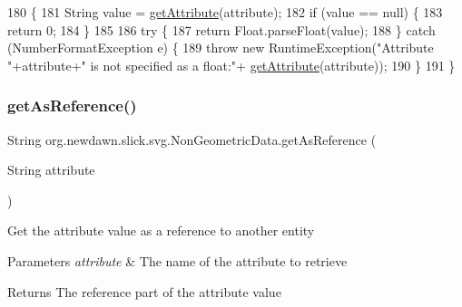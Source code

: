 \begin{DoxyCode}
180                                               \{
181         String value = \mbox{\hyperlink{classorg_1_1newdawn_1_1slick_1_1svg_1_1_non_geometric_data_af14f4628737e3da9379ac25e0a56a92d}{getAttribute}}(attribute);
182         \textcolor{keywordflow}{if} (value == null) \{
183             \textcolor{keywordflow}{return} 0;
184         \}
185         
186         \textcolor{keywordflow}{try} \{
187             \textcolor{keywordflow}{return} Float.parseFloat(value);
188         \} \textcolor{keywordflow}{catch} (NumberFormatException e) \{
189             \textcolor{keywordflow}{throw} \textcolor{keyword}{new} RuntimeException(\textcolor{stringliteral}{"Attribute "}+attribute+\textcolor{stringliteral}{" is not specified as a float:"}+
      \mbox{\hyperlink{classorg_1_1newdawn_1_1slick_1_1svg_1_1_non_geometric_data_af14f4628737e3da9379ac25e0a56a92d}{getAttribute}}(attribute));           
190         \}
191     \}
\end{DoxyCode}
\mbox{\label{classorg_1_1newdawn_1_1slick_1_1svg_1_1_non_geometric_data_a7b5d3b3acd6be8061d53de032c9d5817}} 
\subsubsection{\texorpdfstring{get\+As\+Reference()}{getAsReference()}}
{\footnotesize\ttfamily String org.\+newdawn.\+slick.\+svg.\+Non\+Geometric\+Data.\+get\+As\+Reference (\begin{DoxyParamCaption}\item[{String}]{attribute }\end{DoxyParamCaption})\hspace{0.3cm}{\ttfamily [inline]}}

Get the attribute value as a reference to another entity


\begin{DoxyParams}{Parameters}
{\em attribute} & The name of the attribute to retrieve \\
\hline
\end{DoxyParams}
\begin{DoxyReturn}{Returns}
The reference part of the attribute value 
\end{DoxyReturn}

